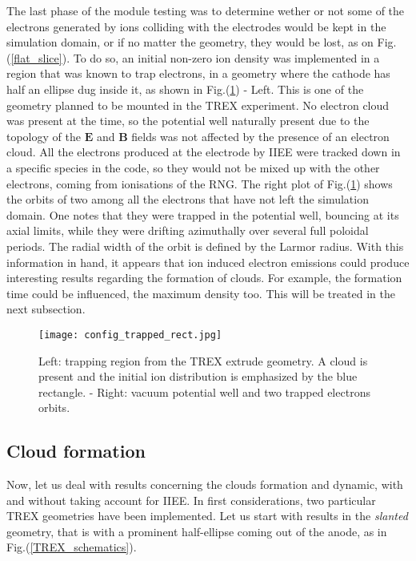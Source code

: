 The last phase of the module testing was to determine wether or not some of the electrons generated by ions colliding with the electrodes would be kept in the simulation domain, or if no matter the geometry, they would be lost, as on Fig.(\ref{flat_slice}). To do so, an initial non-zero ion density was implemented in a region that was known to trap electrons, in a geometry where the cathode has half an ellipse dug inside it, as shown in Fig.(\ref{config_trapped}) - Left. This is one of the geometry planned to be mounted in the TREX experiment. No electron cloud was present at the time, so the potential well naturally present due to the topology of the $\mathbf{E}$ and $\mathbf{B}$ fields was not affected by the presence of an electron cloud. All the electrons produced at the electrode by IIEE were tracked down in a specific species in the code, so they would not be mixed up with the other electrons, coming from ionisations of the RNG. The right plot of Fig.(\ref{config_trapped}) shows the orbits of two among all the electrons that have not left the simulation domain. One notes that they were trapped in the potential well, bouncing at its axial limits, while they were drifting azimuthally over several full poloidal periods. The radial width of the orbit is defined by the Larmor radius. With this information in hand, it appears that ion induced electron emissions could produce interesting results regarding the formation of clouds. For example, the formation time could be influenced, the maximum density too. This will be treated in the next subsection.\\

\begin{figure}[h!]
\centering
	\texttt{[image: config\_trapped\_rect.jpg]}
	\caption{\label{config_trapped} Left: trapping region from the TREX extrude geometry. A cloud is present and the initial ion distribution is emphasized by the blue rectangle. - Right: vacuum potential well and two trapped electrons orbits.}
\end{figure}  

\subsection{Cloud formation}\label{Cloud_section}

Now, let us deal with results concerning the clouds formation and dynamic, with and without taking account for IIEE. In first considerations, two particular TREX geometries have been implemented. Let us start with results in the \emph{slanted} geometry, that is with a prominent half-ellipse coming out of the anode, as in Fig.({\ref{TREX_schematics}}).\\

